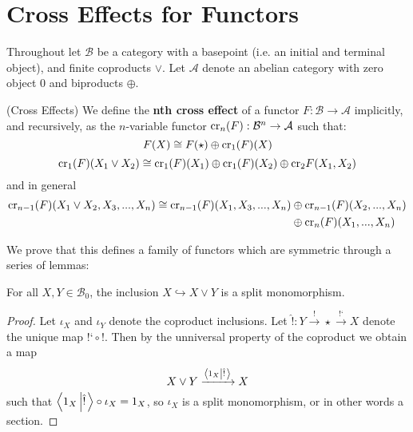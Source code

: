 \section{Cross Effects for Functors}

Throughout let $\mathcal{B}$ be a category with a basepoint (i.e. an initial and terminal object), and finite coproducts $\lor$. Let $\mathcal{A}$ denote an abelian category with zero object $0$ and biproducts $\oplus$.

\begin{defn}[label=defn:crossEffect]{(Cross Effects)}
    We define the \textbf{nth cross effect} of a functor $F:\mathcal{B}\rightarrow \mathcal{A}$ implicitly, and recursively, as the $n$-variable functor $\text{cr}_n(F):\mathcal{B}^n\rightarrow \mathcal{A}$ such that:
    \begin{equation*}
        F(X) \cong F(\star)\oplus \text{cr}_1(F)(X)
    \end{equation*}
    \begin{equation*}
        \text{cr}_1(F)(X_1\lor X_2) \cong \text{cr}_1(F)(X_1)\oplus \text{cr}_1(F)(X_2)\oplus \text{cr}_2F(X_1,X_2)
    \end{equation*}
    and in general
    \begin{align*}
        \text{cr}_{n-1}(F)(X_1\lor X_2,X_3,...,X_n)\cong \text{cr}_{n-1}(F)(X_1,X_3,...,X_n)&\oplus \text{cr}_{n-1}(F)(X_2,...,X_n) \\
        &\oplus \text{cr}_n(F)(X_1,...,X_n)
    \end{align*}
\end{defn}

We prove that this defines a family of functors which are symmetric through a series of lemmas:

\begin{lem}[label=lem:coprodMono]
    For all $X,Y \in \mathcal{B}_0$, the inclusion $X\hookrightarrow X\lor Y$ is a split monomorphism.
\end{lem}
\begin{proof}
    Let $\iota_X$ and $\iota_Y$ denote the coproduct inclusions. Let $\hat{!}:Y\xrightarrow{!} \star\xrightarrow{\text{!`}} X$ denote the unique map $\text{!`}\circ !$. Then by the unniversal property of the coproduct we obtain a map
    \begin{equation*}
        X\lor Y\xrightarrow{\left\langle 1_X\left|\hat{!}\right.\right\rangle}X
    \end{equation*}
    such that $\left\langle 1_X\left|\hat{!}\right.\right\rangle \circ \iota_X= 1_X$, so $\iota_X$ is a split monomorphism, or in other words a section.
\end{proof}

